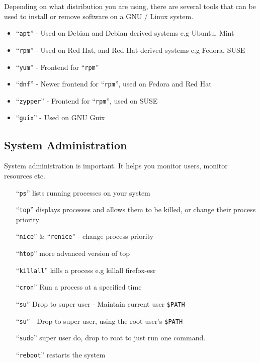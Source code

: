 \documentclass{extbook}
\begin{document}
Depending on what distribution you are using, there are several tools that can be used to install or remove software on a GNU / Linux system.

\begin{itemize}
\item ``\verb|apt|'' - Used on Debian and Debian derived systems e.g Ubuntu, Mint
\item ``\verb|rpm|'' - Used on Red Hat, and Red Hat derived systems e.g Fedora, SUSE
\item ``\verb|yum|'' - Frontend for ``\verb|rpm|''
\item ``\verb|dnf|'' - Newer frontend for ``\verb|rpm|'', used on Fedora and Red Hat
\item ``\verb|zypper|'' - Frontend for ``\verb|rpm|'', used on SUSE
\item ``\verb|guix|'' - Used on GNU Guix
\end{itemize}

\subsection{System Administration}

System administration is important. It helps you monitor users, monitor resources etc.
\begin{itemize}
\item[``\texttt{ps}''] lists running processes on your system
\item[``\texttt{top}''] displays processes and allows them to be killed, or change their process priority
\item[``\texttt{nice}'' \& ``\texttt{renice}''] - change process priority
\item[``\texttt{htop}''] more advanced version of top
\item[``\texttt{killall}''] kills a process e.g killall firefox-esr
\item[``\texttt{cron}''] Run a process at a specified time
\item[``\texttt{su}''] Drop to super user - Maintain current user \verb|$PATH|
\item[``\texttt{su}''] - Drop to super user, using the root user's \verb|$PATH|
\item[``\texttt{sudo}''] super user do, drop to root to just run one command.
\item[``\texttt{reboot}''] restarts the system
\end{itemize}
\end{document}
